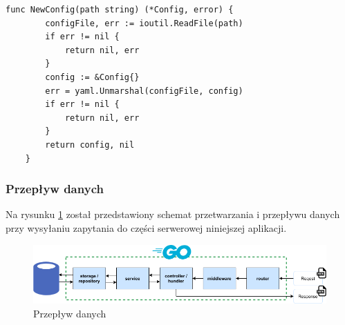 \begin{lstlisting}[label=list:config_restapi_new,caption=Wczytanie pliku konfiguracyjnego części serwerowej.,basicstyle=\tiny\ttfamily]
    func NewConfig(path string) (*Config, error) {
        configFile, err := ioutil.ReadFile(path)
        if err != nil {
            return nil, err
        }
        config := &Config{}
        err = yaml.Unmarshal(configFile, config)
        if err != nil {
            return nil, err
        }
        return config, nil
    }
\end{lstlisting}
% 
\subsubsection{Przepływ danych}
Na rysunku \ref{fig:backend_data_flow} został przedstawiony schemat przetwarzania i przepływu danych przy wysyłaniu zapytania do części serwerowej niniejszej aplikacji.
\begin{figure}[ht]
\centering
\includegraphics[width=1\linewidth]{rys03/backend_data_flow.png}
\caption{Przepływ danych}
\label{fig:backend_data_flow}
\end{figure}

% 

